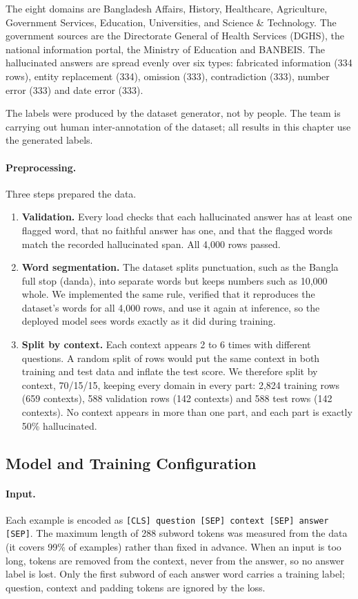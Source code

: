The eight domains are Bangladesh Affairs, History, Healthcare, Agriculture,
Government Services, Education, Universities, and Science \& Technology. The
government sources are the Directorate General of Health Services (DGHS), the
national information portal, the Ministry of Education and BANBEIS. The
hallucinated answers are spread evenly over six types: fabricated information
(334 rows), entity replacement (334), omission (333), contradiction (333),
number error (333) and date error (333).

The labels were produced by the dataset generator, not by people. The team is
carrying out human inter-annotation of the dataset; all results in this chapter
use the generated labels.

\paragraph{Preprocessing.} Three steps prepared the data.
\begin{enumerate}
  \item \textbf{Validation.} Every load checks that each hallucinated answer has
  at least one flagged word, that no faithful answer has one, and that the
  flagged words match the recorded hallucinated span. All 4,000 rows passed.
  \item \textbf{Word segmentation.} The dataset splits punctuation, such as the
  Bangla full stop (danda), into separate words but keeps numbers such as
  10,000 whole. We implemented the same rule, verified that it reproduces the
  dataset's words for all 4,000 rows, and use it again at inference, so the
  deployed model sees words exactly as it did during training.
  \item \textbf{Split by context.} Each context appears 2 to 6 times with
  different questions. A random split of rows would put the same context in
  both training and test data and inflate the test score. We therefore split
  by context, 70/15/15, keeping every domain in every part: 2,824 training rows
  (659 contexts), 588 validation rows (142 contexts) and 588 test rows (142
  contexts). No context appears in more than one part, and each part is exactly
  50\% hallucinated.
\end{enumerate}

\subsection{Model and Training Configuration}

\paragraph{Input.} Each example is encoded as
\texttt{[CLS] question [SEP] context [SEP] answer [SEP]}. The maximum length of
288 subword tokens was measured from the data (it covers 99\% of examples)
rather than fixed in advance. When an input is too long, tokens are removed from
the context, never from the answer, so no answer label is lost. Only the first
subword of each answer word carries a training label; question, context and
padding tokens are ignored by the loss.

